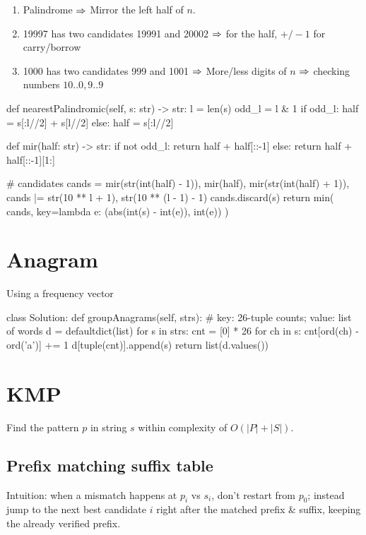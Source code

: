 \begin{enumerate}
\item Palindrome $\Rightarrow$ Mirror the left half of $n$.
\item 19997 has two candidates 19991 and 20002 $\Rightarrow$ for the half, $+/-1$ for carry/borrow
\item 1000 has two candidates 999 and 1001 $\Rightarrow$ More/less digits of $n$ $\Rightarrow$ checking numbers $10..0, 9..9$
\end{enumerate}
\begin{python}
def nearestPalindromic(self, s: str) -> str:
  l = len(s)
  odd_l = l & 1
  if odd_l:
    half = s[:l//2] + s[l//2]
  else:
    half = s[:l//2]

  def mir(half: str) -> str:
    if not odd_l:
      return half + half[::-1]
    else:
      return half + half[::-1][1:]

  # candidates
  cands = {
    mir(str(int(half) - 1)), 
    mir(half), 
    mir(str(int(half) + 1)),
  }
  cands |= {
    str(10 ** l + 1), 
    str(10 ** (l - 1) - 1)
  }
  cands.discard(s)
  return min(
    cands, 
    key=lambda e: (abs(int(s) - int(e)), int(e))
  )
\end{python}
\section{Anagram}

Using a frequency vector 
\begin{python}
class Solution:
  def groupAnagrams(self, strs):
    # key: 26-tuple counts; value: list of words
    d = defaultdict(list)
    for s in strs:
      cnt = [0] * 26
      for ch in s:
        cnt[ord(ch) - ord('a')] += 1
      d[tuple(cnt)].append(s)
    return list(d.values())
\end{python}

\section{KMP}
Find the pattern $p$ in string $s$ within complexity of $O(|P|+|S|)$.

\subsection{Prefix matching suffix table}
Intuition: when a mismatch happens at $p_i$ vs $s_i$, don't restart from $p_0$; instead jump to the next best candidate $i$ right after the matched prefix \& suffix, keeping the already verified prefix.

